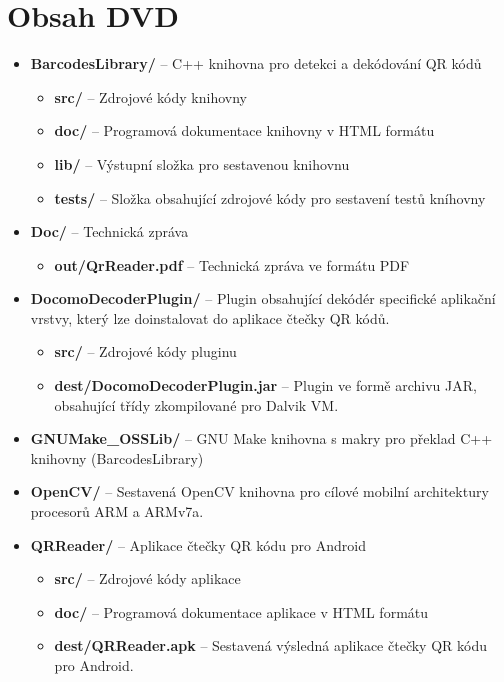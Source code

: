\chapter{Obsah DVD}
\label{obsahDVD}

\begin{itemize}
  \item \textbf{BarcodesLibrary/} -- C++ knihovna pro detekci a dekódování QR
  kódů
  	\begin{itemize}
  	  \item \textbf{src/} -- Zdrojové kódy knihovny
  	  \item \textbf{doc/} -- Programová dokumentace knihovny v HTML formátu
  	  \item \textbf{lib/} -- Výstupní složka pro sestavenou knihovnu
  	  \item \textbf{tests/} -- Složka obsahující zdrojové kódy pro sestavení
  	  testů kníhovny
	\end{itemize}
  \item \textbf{Doc/} -- Technická zpráva
  	\begin{itemize}
  	  \item \textbf{out/QrReader.pdf} -- Technická zpráva ve formátu PDF
	\end{itemize}
  \item \textbf{DocomoDecoderPlugin/} -- Plugin obsahující dekódér
  specifické aplikační vrstvy, který lze doinstalovat do aplikace čtečky QR
  kódů.
  	\begin{itemize}
  	  \item \textbf{src/} -- Zdrojové kódy pluginu
  	  \item \textbf{dest/DocomoDecoderPlugin.jar} -- Plugin ve formě archivu JAR,
  	  obsahující třídy zkompilované pro Dalvik VM.
	\end{itemize}
  \item \textbf{GNUMake\_OSSLib/} -- GNU Make knihovna s makry pro překlad C++
  knihovny (BarcodesLibrary)
  \item \textbf{OpenCV/} -- Sestavená OpenCV knihovna pro cílové mobilní
  architektury procesorů ARM a ARMv7a.
  \item \textbf{QRReader/} -- Aplikace čtečky QR kódu pro Android
  	\begin{itemize}
  	  \item \textbf{src/} -- Zdrojové kódy aplikace
  	  \item \textbf{doc/} -- Programová dokumentace aplikace v HTML formátu
  	  \item \textbf{dest/QRReader.apk} -- Sestavená výsledná aplikace čtečky QR
  	  kódu pro Android.
	\end{itemize}
\end{itemize}

